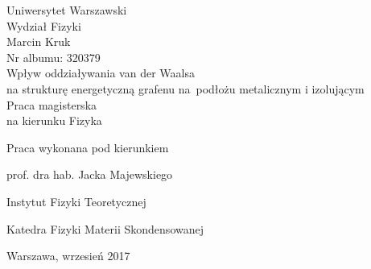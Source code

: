 \thispagestyle{empty}
\vspace*{2cm}
\begin{center}
{\huge Uniwersytet Warszawski\\ \vspace{0.3cm}
Wydział Fizyki}\\
\vspace{1.5cm}
Marcin Kruk\\
Nr albumu: 320379\\
\vspace{1.5cm}
{\huge Wpływ oddziaływania van der Waalsa\\
	na strukturę energetyczną grafenu
	\mbox{na podłożu} metalicznym i izolującym}\\

\vspace{2cm}
Praca magisterska\\
na kierunku Fizyka
\end{center}
\vspace{3cm}
\hfill Praca wykonana pod kierunkiem \vspace{0.2cm}

\hfill prof. dra hab. Jacka Majewskiego

\hfill Instytut Fizyki Teoretycznej

\hfill Katedra Fizyki Materii Skondensowanej
\vfill
\begin{center}
{\large Warszawa, wrzesień 2017}\\
\end{center}
